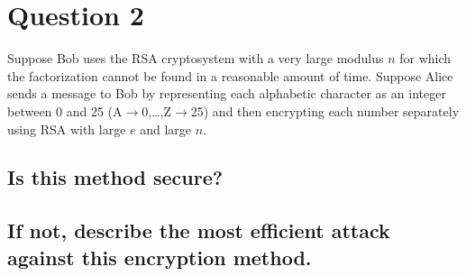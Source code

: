 \documentclass{report}
\begin{document}
	\section{Question 2}
	\startsection
		\renewcommand{\thesubsection}{\thesection.\Alph{subsection}}
		Suppose Bob uses the RSA cryptosystem with a very large modulus $n$ for which the factorization cannot be found in a reasonable amount of time. Suppose Alice sends a message to Bob by representing each alphabetic character as an integer between 0 and 25 (A$\rightarrow$0,…,Z$\rightarrow$25) and then encrypting each number separately using RSA with large $e$ and large $n$. 
		\subsection{Is this method secure?}
		\startsubsection
		\closesection
		\subsection{If not, describe the most efficient attack against this encryption method.}
		\startsubsection
		\closesection
	\closesection
\end{document}
